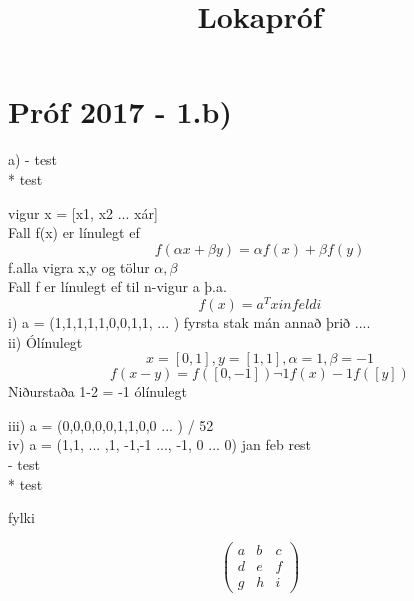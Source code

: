 \documentclass[]{article}
\begin{document}
\title{Lokapróf}
\maketitle

\section*{Próf 2017 - 1.b)}

a) 
- test \\
* test

vigur x = [x1, x2 ... xár] \\
Fall f(x) er línulegt ef $$ f(\alpha x + \beta y) = \alpha f(x) + \beta f(y) $$
f.alla vigra x,y og tölur $\alpha,\beta$ \\
Fall f er línulegt ef til n-vigur a þ.a. $$ f(x) = a ^{T}x  infeldi $$
i) a = (1,1,1,1,1,0,0,1,1, ... ) fyrsta stak mán annað þrið .... \\

ii) Ólínulegt $$ x=[0,1], y=[1,1], \alpha = 1, \beta = -1 $$
$$ f(x-y) = f([0,-1]) \neg 1f(x) -1f([y]) $$
Niðurstaða 1-2 = -1 ólínulegt

iii) a = (0,0,0,0,0,1,1,0,0 ... ) / 52 \\

iv) a = (1,1, ... ,1, -1,-1 ..., -1, 0 ... 0) jan feb rest \\

- test \\

* test


\begin{center}
	fylki
\end{center}
\[ \left( \begin{array}{ccc}
a & b & c \\
d & e & f \\
g & h & i \end{array} \right)\] 
\end{document}
